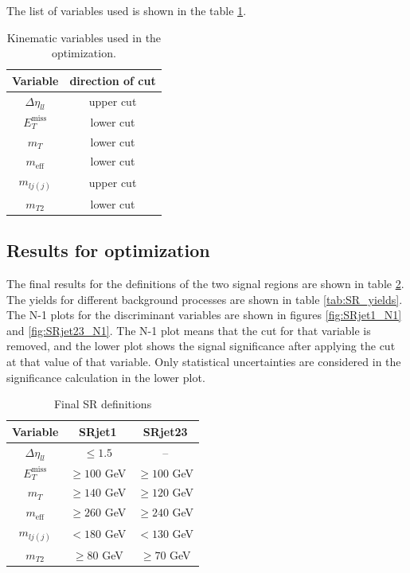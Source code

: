 The list of variables used is shown in the table \ref{tab:variables_optimization}.

\begin{table}[htbp]
\centering
\begin{tabular}{|c|c|}
\hline
Variable & direction of cut \\
\hline
\hline
$\Delta \eta_{ll}$ & upper cut \\
\hline
$E_T^{\text{miss}}$ & lower cut \\
\hline
$m_T$ & lower cut \\
\hline
$m_{\text{eff}}$ & lower cut \\
\hline
$m_{lj(j)}$ & upper cut \\
\hline
$m_{T2}$ & lower cut \\
\hline
\end{tabular}
\caption{Kinematic variables used in the optimization.}
\label{tab:variables_optimization}
\end{table}

\subsection{Results for optimization}
The final results for the definitions of the two signal regions are shown in table \ref{tab:SR_Def}.
The yields for different background processes are shown in table \ref{tab:SR_yields}.
The N-1 plots for the discriminant variables are shown in figures \ref{fig:SRjet1_N1} and \ref{fig:SRjet23_N1}.
The N-1 plot means that the cut for that variable is removed, and the lower plot shows the signal significance after applying the cut at that value of that variable.
Only statistical uncertainties are considered in the significance calculation in the lower plot.

\begin{table}[htpb]
\centering
\begin{tabular}{|c|c|c|}
\hline
Variable &  SRjet1 & SRjet23 \\ \hline
$\Delta\eta_{ll}$ & $\leq 1.5$ &  -- \\
$E_T^{\text{miss}}$ &  $\geq 100 $ GeV  & $\geq 100$ GeV\\
$m_T$ & $\geq 140$ GeV & $\geq 120$ GeV \\
$m_{\text{eff}}$ & $\geq 260$ GeV &  $\geq 240$ GeV\\
$m_{lj(j)}$ & $< 180$ GeV &  $< 130$ GeV\\
$m_{T2}$ & $\geq 80$ GeV&  $\geq 70$ GeV \\
\hline
\end{tabular}
\caption{Final SR definitions}
\label{tab:SR_Def}
\end{table}


